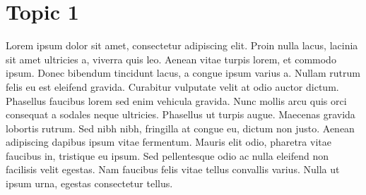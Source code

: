 \section{Topic 1}
Lorem ipsum dolor sit amet, consectetur adipiscing elit. Proin nulla lacus, lacinia sit amet ultricies a, viverra quis leo. Aenean vitae turpis lorem, et commodo ipsum. Donec bibendum tincidunt lacus, a congue ipsum varius a. Nullam rutrum felis eu est eleifend gravida. Curabitur vulputate velit at odio auctor dictum. Phasellus faucibus lorem sed enim vehicula gravida. Nunc mollis arcu quis orci consequat a sodales neque ultricies. Phasellus ut turpis augue. Maecenas gravida lobortis rutrum. Sed nibh nibh, fringilla at congue eu, dictum non justo. Aenean adipiscing dapibus ipsum vitae fermentum. Mauris elit odio, pharetra vitae faucibus in, tristique eu ipsum. Sed pellentesque odio ac nulla eleifend non facilisis velit egestas. Nam faucibus felis vitae tellus convallis varius. Nulla ut ipsum urna, egestas consectetur tellus.

